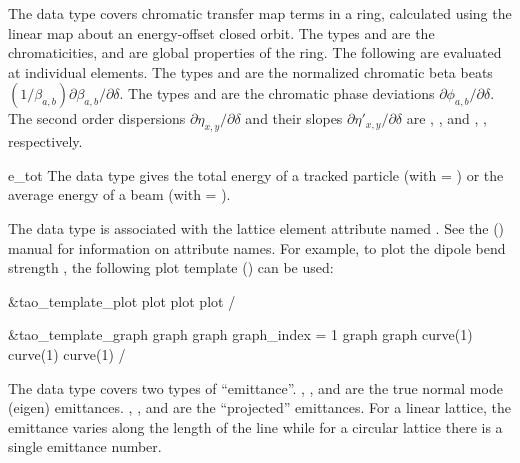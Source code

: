 \begin{description}
  \item[chrom.] \Newline
The  data type covers chromatic transfer map terms in a ring, calculated using
the linear map about an energy-offset closed orbit.  The types  and
 are the chromaticities, and are global properties of the ring. The
following are evaluated at individual elements.  The types  and
 are the normalized chromatic beta beats
$(1/\beta_{a,b})\partial\beta_{a,b}/\partial\delta$.  The types  and
 are the chromatic phase deviations $\partial\phi_{a,b}/\partial\delta$.
The second order dispersions $\partial\eta_{x,y}/\partial\delta$ and their slopes
$\partial\eta'_{x,y}/\partial\delta$ are , , and
, , respectively.

  \item{e_tot}
The  data type gives the total energy of a tracked particle (with
 = ) or the average energy of a beam (with  =
).

  \item[element_attrib.] \Newline
The  data type is associated with the
lattice element attribute named . See the \bmad
(\cite{b:bmad}) manual for information on attribute names. For
example, to plot the dipole bend strength , the following
plot template () can be used:
\begin{example}
  &tao_template_plot
    plot%
    plot%
    plot%
  /

  &tao_template_graph
    graph%
    graph%
    graph_index = 1
    graph%
    graph%
    curve(1)%
    curve(1)%
    curve(1)%
  /
\end{example}

  \item[emit.] \Newline
The  data type covers two types of
``emittance''. , , and  are the true
normal mode (eigen) emittances. , , and
 are the ``projected'' emittances\cite{b:emit}. 
For a linear lattice, the emittance varies along the length
of the line while for a circular lattice there is a single emittance
number. 


\end{description}
